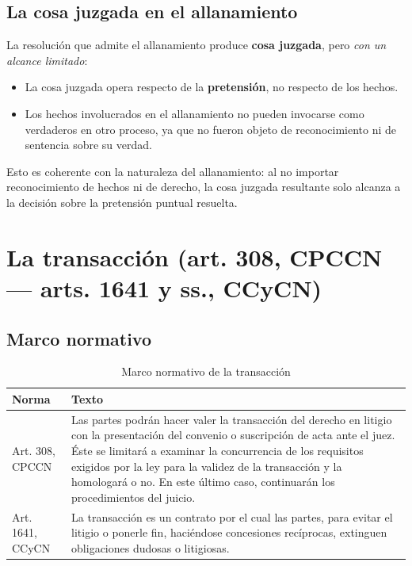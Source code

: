 \documentclass[12pt,oneside]{book}
\begin{document}
\section{La cosa juzgada en el allanamiento}
\label{allanamiento_cj}

La resolución que admite el allanamiento produce \textbf{cosa juzgada}, pero \emph{con un alcance limitado}:

\begin{itemize}
    \item La cosa juzgada opera respecto de la \textbf{pretensión}, no respecto de los hechos.
    \item Los hechos involucrados en el allanamiento no pueden invocarse como verdaderos en otro proceso, ya que no fueron objeto de reconocimiento ni de sentencia sobre su verdad.
\end{itemize}

Esto es coherente con la naturaleza del allanamiento: al no importar reconocimiento de hechos ni de derecho, la cosa juzgada resultante solo alcanza a la decisión sobre la pretensión puntual resuelta.

\chapter{La transacción (art. 308, CPCCN --- arts. 1641 y ss., CCyCN)}

\section{Marco normativo}

\begin{table}[H]
\centering
\begin{tabularx}{\textwidth}{
    >{\raggedright\arraybackslash}p{}
    >{\raggedright\arraybackslash}X
}
\toprule
\textbf{Norma} & \textbf{Texto} \\
\midrule
Art. 308, CPCCN & Las partes podrán hacer valer la transacción del derecho en litigio con la presentación del convenio o suscripción de acta ante el juez. Éste se limitará a examinar la concurrencia de los requisitos exigidos por la ley para la validez de la transacción y la homologará o no. En este último caso, continuarán los procedimientos del juicio. \\
\addlinespace
Art. 1641, CCyCN & La transacción es un contrato por el cual las partes, para evitar el litigio o ponerle fin, haciéndose concesiones recíprocas, extinguen obligaciones dudosas o litigiosas. \\
\bottomrule
\end{tabularx}
\caption{Marco normativo de la transacción}
\end{table}
\end{document}
